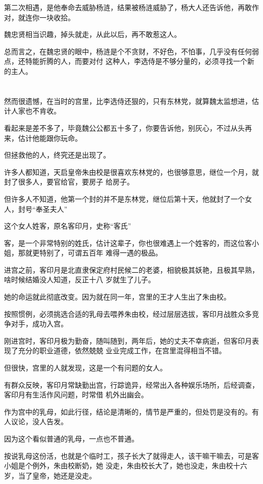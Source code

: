 \documentclass[11pt,a4paper,onecolumn]{article}
\begin{document}
第二次相遇，是他奉命去威胁杨涟，结果被杨涟威胁了，杨大人还告诉他，再敢作对，就连你一块收拾。

魏忠贤相当识趣，掉头就走，从此以后，再不敢惹这人。

总而言之，在魏忠贤的眼中，杨涟是个不贪财，不好色，不怕事，几乎没有任何弱点，还特能折腾的人，而要对付
这种人，李选侍是不够分量的，必须寻找一个新的主人。

\section[\thesection]{}

然而很遗憾，在当时的宫里，比李选侍还狠的，只有东林党，就算魏太监想进，估计人家也不肯收。

看起来是差不多了，毕竟魏公公都五十多了，你要告诉他，别灰心，不过从头再来，估计他能跟你玩命。

但拯救他的人，终究还是出现了。

许多人都知道，天启皇帝朱由校是很喜欢东林党的，也很够意思，继位一个月，就封了很多人，要官给官，要房子
给房子。

但许多人不知道，他第一个封的并不是东林党，继位后第十天，他就封了一个女人，封号``奉圣夫人''

这个女人姓客，原名客印月，史称``客氏''

客，是一个非常特别的姓氏，估计这辈子，你也很难遇上一个姓客的，而这位客小姐，那就更特别了，可谓五百年
难得一遇的极品。

进宫之前，客印月是北直隶保定府村民候二的老婆，相貌极其妖艳，且极其早熟，啥时候结婚没人知道，反正十八
岁就生了儿子。

她的命运就此彻底改变。因为就在同一年，宫里的王才人生出了朱由校。

按照惯例，必须挑选合适的乳母去喂养朱由校，经过层层选拔，客印月战胜众多竞争对手，成功入宫。

刚进宫时，客印月极为勤奋，随叫随到，两年后，她的丈夫不幸病逝，但客印月表现了充分的职业道德，依然兢兢
业业完成工作，在宫里混得相当不错。

但很快，宫里的人就发现，这是一个有问题的女人。

有群众反映，客印月常缺勤出宫，行踪诡异，经常出入各种娱乐场所，后经调查，客印月有生活作风问题，时常借
机外出幽会。

作为宫中的乳母，如此行径，结论是清晰的，情节是严重的，但处罚是没有的。有人议论，没人告发。

因为这个看似普通的乳母，一点也不普通。

按说乳母这份活，也就是个临时工，孩子长大了就得走人，该干嘛干嘛去，可是客小姐是个例外，朱由校断奶，她
没走，朱由校长大了，她也没走，朱由校十六岁，当了皇帝，她还是没走。
\end{document}
